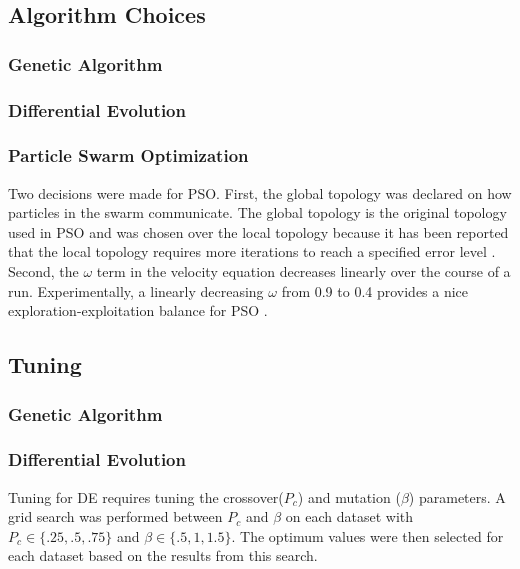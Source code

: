 \documentclass[twoside,11pt]{article}
\begin{document}
\subsection{Algorithm Choices}

\subsubsection{Genetic Algorithm}

\subsubsection{Differential Evolution}

\subsubsection{Particle Swarm Optimization}

	
	Two decisions were made for PSO. First, the global topology was declared on how particles in the swarm communicate. 
	The global topology is the original topology used in PSO and was chosen over the local topology because it has been reported that the local topology requires more iterations to reach a specified error level \citep{og-pso}. 
	Second, the $\omega$ term in the velocity equation decreases linearly over the course of a run. Experimentally, a linearly decreasing $\omega$ from 0.9 to 0.4 provides a nice exploration-exploitation balance for PSO \citep{inertia}.

\subsection{Tuning}

\subsubsection{Genetic Algorithm}

\subsubsection{Differential Evolution}

	Tuning for DE requires tuning the crossover($P_c$) and mutation ($\beta$) parameters. A grid search was performed between $P_c$ and $\beta$ on each dataset with $P_c \in \{.25, .5, .75\}$ and $\beta \in \{.5, 1, 1.5\}$.
	The optimum values were then selected for each dataset based on the results from this search. 
\end{document}
